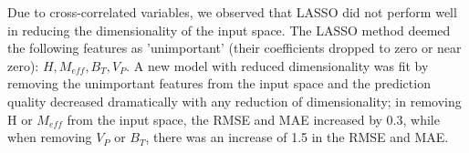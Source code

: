\documentclass[a4paper, twoside, final, 12pt]{article}
\begin{document}
{
Due to cross-correlated variables, we observed that LASSO did not perform well in reducing the dimensionality of the input space. The LASSO method deemed the following features as 'unimportant' (their coefficients dropped to zero or near zero): $H, M_{eff}, B_T, V_P$. A new model with reduced dimensionality was fit by removing the unimportant features from the input space and the prediction quality decreased dramatically with any reduction of dimensionality; in removing H or $M_{eff}$ from the input space, the RMSE and MAE increased by 0.3, while when removing $V_P$ or $B_T$, there was an increase of 1.5 in the RMSE and MAE. 

}
\end{document}
